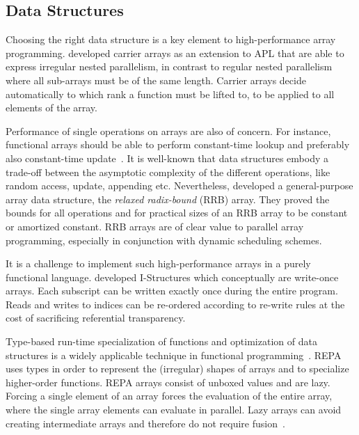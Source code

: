 \documentclass[a4paper]{article}
\begin{document}
\subsection{Data Structures}
\label{sec:data-structures}

Choosing the right data structure is a key element to high-performance array programming. \citet{Lowney:1981:CAI:567532.567533} developed carrier arrays as an extension to APL that are able to express irregular nested parallelism, in contrast to regular nested parallelism where all sub-arrays must be of the same length. Carrier arrays decide automatically to which rank a function must be lifted to, to be applied to all elements of the array.

Performance of single operations on arrays are also of concern. For instance, functional arrays should be able to perform constant-time lookup and preferably also constant-time update~\cite{47507}. It is well-known that data structures embody a trade-off between the asymptotic complexity of the different operations, like random access, update, appending etc. Nevertheless, \citet{Stucki:2015:RVP:2784731.2784739} developed a general-purpose array data structure, the \textit{relaxed radix-bound} (RRB) array. They proved the bounds for all operations and for practical sizes of an RRB array to be constant or amortized constant. RRB arrays are of clear value to parallel array programming, especially in conjunction with dynamic scheduling schemes.

It is a challenge to implement such high-performance arrays in a purely functional language. \citet{Arvind:1989:IDS:69558.69562} developed I-Structures which conceptually are write-once arrays. Each subscript can be written exactly once during the entire program. Reads and writes to indices can be re-ordered according to re-write rules at the cost of sacrificing referential transparency.

Type-based run-time specialization of functions and optimization of data structures is a widely applicable technique in functional programming~\cite{Hall:1994:UHT:182409.156781}. REPA~\cite{Keller:2010:RSP:1863543.1863582} uses types in order to represent the (irregular) shapes of arrays and to specialize higher-order functions. REPA arrays consist of unboxed values and are lazy. Forcing a single element of an array forces the evaluation of the entire array, where the single array elements can evaluate in parallel. Lazy arrays can avoid creating intermediate arrays and therefore do not require fusion~\cite{Keller:2010:RSP:1863543.1863582}.
\end{document}
